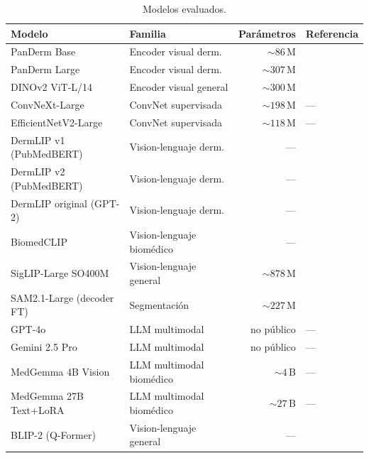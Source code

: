 \begin{table}[H]
\centering
\footnotesize
\setlength{\tabcolsep}{4pt}
\renewcommand{\arraystretch}{0.95}
\caption{Modelos evaluados.}
\label{tab:modelos}
\begin{tabular}{llrl}
\hline
Modelo & Familia & Parámetros & Referencia \\
\hline
PanDerm Base                & Encoder visual derm.       & $\sim 86$\,M & \cite{panderm2025} \\
PanDerm Large               & Encoder visual derm.       & $\sim 307$\,M & \cite{panderm2025} \\
DINOv2 ViT-L/14             & Encoder visual general     & $\sim 300$\,M & \cite{dinov2} \\
ConvNeXt-Large              & ConvNet supervisada        & $\sim 198$\,M & --- \\
EfficientNetV2-Large        & ConvNet supervisada        & $\sim 118$\,M & --- \\
DermLIP v1 (PubMedBERT)     & Vision-lenguaje derm.      & --- & \cite{derm1m} \\
DermLIP v2 (PubMedBERT)     & Vision-lenguaje derm.      & --- & \cite{derm1m} \\
DermLIP original (GPT-2)    & Vision-lenguaje derm.      & --- & \cite{derm1m} \\
BiomedCLIP                  & Vision-lenguaje biomédico  & --- & \cite{biomedclip} \\
SigLIP-Large SO400M         & Vision-lenguaje general    & $\sim 878$\,M & \cite{siglip2023} \\
SAM2.1-Large (decoder FT)   & Segmentación               & $\sim 227$\,M & \cite{sam2} \\
GPT-4o                      & LLM multimodal             & no público & --- \\
Gemini 2.5 Pro              & LLM multimodal             & no público & --- \\
MedGemma 4B Vision          & LLM multimodal biomédico   & $\sim 4$\,B & --- \\
MedGemma 27B Text+LoRA      & LLM multimodal biomédico   & $\sim 27$\,B & --- \\
BLIP-2 (Q-Former)           & Vision-lenguaje general    & --- & \cite{blip2_2023} \\
\hline
\end{tabular}
\end{table}

